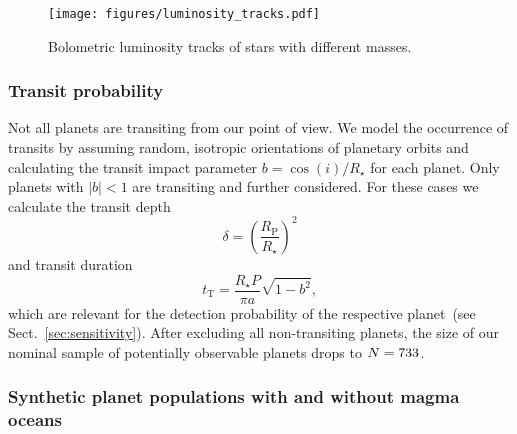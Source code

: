 \documentclass[modern]{aastex631}
\begin{document}
\begin{figure}[ht!]
    \begin{centering}
        \texttt{[image: figures/luminosity\_tracks.pdf]}
        \caption{
            Bolometric luminosity tracks of stars with different masses.
        }
        \label{fig:luminosity_tracks}
    \end{centering}
\end{figure}



\subsubsection{Transit probability}
\begin{note}
    Not all planets are transiting from our point of view.
    We model the occurrence of transits by assuming random, isotropic orientations of planetary orbits and calculating the transit impact parameter $b = \cos(i)/R_\star$ for each planet.
    Only planets with $|b| < 1$ are transiting and further considered.
    For these cases we calculate the transit depth
    \begin{equation}\label{eq:transitdepth}
        \delta = \left( \frac{R_\mathrm{P}}{R_\star} \right)^2
    \end{equation}
    and transit duration
    \begin{equation}\label{eq:transitduration}
        t_{\mathrm{T}} = \frac{R_\star P}{\pi a} \sqrt{1 - b^2},
    \end{equation}
    which are relevant for the detection probability of the respective planet~(see Sect.~\ref{sec:sensitivity}).
    After excluding all non-transiting planets, the size of our nominal sample of potentially observable planets drops to $N = 733$.
\end{note}




\subsubsection{Synthetic planet populations with and without magma oceans}
\begin{note}

\end{note}
\end{document}
